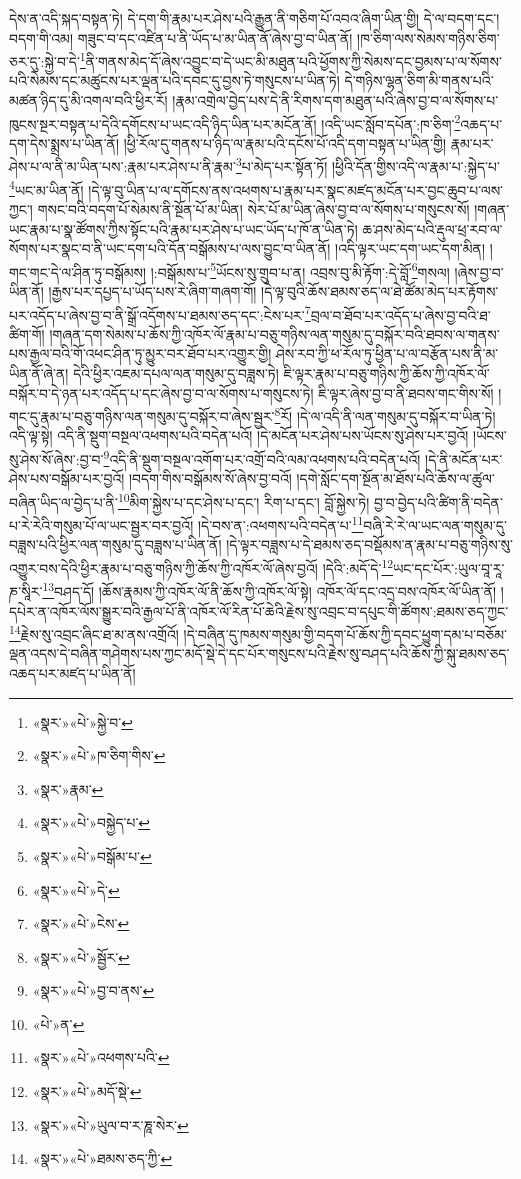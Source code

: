 དེས་ན་འདི་སྐད་བསྟན་ཏེ། དེ་དག་གི་རྣམ་པར་ཤེས་པའི་རྒྱུན་ནི་གཅིག་པོ་འབའ་ཞིག་ཡིན་གྱི། དེ་ལ་བདག་དང་། བདག་གི་འམ། གཟུང་བ་དང་འཛིན་པ་ནི་ཡོད་པ་མ་ཡིན་ནོ་ཞེས་བྱ་བ་ཡིན་ནོ། །ཁ་ཅིག་ལས་སེམས་གཉིས་ཅིག་ཅར་དུ་:སྐྱེ་བ་དེ་\footnote{«སྣར་»«པེ་»སྐྱེ་བ་}ནི་གནས་མེད་དོ་ཞེས་འབྱུང་བ་དེ་ཡང་མི་མཐུན་པའི་ཕྱོགས་ཀྱི་སེམས་དང་བྱམས་པ་ལ་སོགས་པའི་སེམས་དང་མཚུངས་པར་ལྡན་པའི་དབང་དུ་བྱས་ཏེ་གསུངས་པ་ཡིན་ཏེ། དེ་གཉིས་ལྷན་ཅིག་མི་གནས་པའི་མཚན་ཉིད་དུ་མི་འགལ་བའི་ཕྱིར་རོ། །རྣམ་འགྲེལ་བྱེད་པས་དེ་ནི་རིགས་དག་མཐུན་པའི་ཞེས་བྱ་བ་ལ་སོགས་པ་ཁུངས་སྔར་བསྟན་པ་དེའི་དགོངས་པ་ཡང་འདི་ཉིད་ཡིན་པར་མངོན་ནོ། །འདི་ཡང་སློབ་དཔོན་:ཁ་ཅིག་\footnote{«སྣར་»«པེ་»ཁ་ཅིག་གིས་}འཆད་པ་དག་དེས་སྨྲས་པ་ཡིན་ནོ། །ཕྱི་རོལ་དུ་གནས་པ་ཉིད་ལ་རྣམ་པའི་དངོས་པོ་འདི་དག་བསྟན་པ་ཡིན་གྱི། རྣམ་པར་ཤེས་པ་ལ་ནི་མ་ཡིན་པས་:རྣམ་པར་ཤེས་པ་ནི་རྣམ་\footnote{«སྣར་»རྣམ་}པ་མེད་པར་སྟོན་ཏོ། །ཕྱིའི་དོན་གྱིས་འདི་ལ་རྣམ་པ་:སྐྱེད་པ་\footnote{«སྣར་»«པེ་»བསྐྱེད་པ་}ཡང་མ་ཡིན་ནོ། །དེ་ལྟ་བུ་ཡིན་པ་ལ་དགོངས་ནས་འཕགས་པ་རྣམ་པར་སྣང་མཛད་མངོན་པར་བྱང་ཆུབ་པ་ལས་ཀྱང་། གསང་བའི་བདག་པོ་སེམས་ནི་སྔོན་པོ་མ་ཡིན། སེར་པོ་མ་ཡིན་ཞེས་བྱ་བ་ལ་སོགས་པ་གསུངས་སོ། །གཞན་ཡང་རྣམ་པ་སྣ་ཚོགས་ཀྱིས་སྟོང་པའི་རྣམ་པར་ཤེས་པ་ཡང་ཡོད་པ་ཁོ་ན་ཡིན་ཏེ། ཆ་ཤས་མེད་པའི་རྡུལ་ཕྲ་རབ་ལ་སོགས་པར་སྣང་བ་ནི་ཡང་དག་པའི་དོན་བསྒོམས་པ་ལས་བྱུང་བ་ཡིན་ནོ། །འདི་ལྟར་ཡང་དག་ཡང་དག་མིན། །གང་གང་དེ་ལ་ཤིན་ཏུ་བསྒོམས། །:བསྒོམས་པ་\footnote{«སྣར་»«པེ་»བསྒོམ་པ་}ཡོངས་སུ་གྲུབ་པ་ན། འབྲས་བུ་མི་རྟོག་:དེ་བློ་\footnote{«སྣར་»«པེ་»དེ་}གསལ། །ཞེས་བྱ་བ་ཡིན་ནོ། །རྒྱས་པར་དཔྱད་པ་ཡོད་པས་རེ་ཞིག་གཞག་གོ། །དེ་ལྟ་བུའི་ཆོས་ཐམས་ཅད་ལ་ཐེ་ཚོམ་མེད་པར་རྟོགས་པར་འདོད་པ་ཞེས་བྱ་བ་ནི་སྒྲོ་འདོགས་པ་ཐམས་ཅད་དང་:ངེས་པར་\footnote{«སྣར་»«པེ་»ངེས་}བྲལ་བ་ཐོབ་པར་འདོད་པ་ཞེས་བྱ་བའི་ཐ་ཚིག་གོ། །གཞན་དག་སེམས་པ་ཆོས་ཀྱི་འཁོར་ལོ་རྣམ་པ་བཅུ་གཉིས་ལན་གསུམ་དུ་བསྐོར་བའི་ཐབས་ལ་གནས་པས་རྒྱལ་བའི་གོ་འཕང་ཤིན་ཏུ་མྱུར་བར་ཐོབ་པར་འགྱུར་གྱི། ཤེས་རབ་ཀྱི་ཕ་རོལ་ཏུ་ཕྱིན་པ་ལ་བརྩོན་པས་ནི་མ་ཡིན་ནོ་ཞེ་ན། དེའི་ཕྱིར་འཇམ་དཔལ་ལན་གསུམ་དུ་བཟླས་ཏེ། ཇི་ལྟར་རྣམ་པ་བཅུ་གཉིས་ཀྱི་ཆོས་ཀྱི་འཁོར་ལོ་བསྐོར་བ་དེ་ཉན་པར་འདོད་པ་དང་ཞེས་བྱ་བ་ལ་སོགས་པ་གསུངས་ཏེ། ཇི་ལྟར་ཞེས་བྱ་བ་ནི་ཐབས་གང་གིས་སོ། །གང་དུ་རྣམ་པ་བཅུ་གཉིས་ལན་གསུམ་དུ་བསྐོར་བ་ཞེས་སྦྱར་\footnote{«སྣར་»«པེ་»སྦྱོར་}རོ། །དེ་ལ་འདི་ནི་ལན་གསུམ་དུ་བསྐོར་བ་ཡིན་ཏེ། འདི་ལྟ་སྟེ། འདི་ནི་སྡུག་བསྔལ་འཕགས་པའི་བདེན་པའོ། །དེ་མངོན་པར་ཤེས་པས་ཡོངས་སུ་ཤེས་པར་བྱའོ། །ཡོངས་སུ་ཤེས་སོ་ཞེས་:བྱ་བ་\footnote{«སྣར་»«པེ་»བྱ་བ་ནས་}འདི་ནི་སྡུག་བསྔལ་འགོག་པར་འགྲོ་བའི་ལམ་འཕགས་པའི་བདེན་པའོ། །དེ་ནི་མངོན་པར་ཤེས་པས་བསྒོམ་པར་བྱའོ། །བདག་གིས་བསྒོམས་སོ་ཞེས་བྱ་བའོ། །དགེ་སློང་དག་སྔོན་མ་ཐོས་པའི་ཆོས་ལ་ཚུལ་བཞིན་ཡིད་ལ་བྱེད་པ་ནི་\footnote{«པེ་»ན་}མིག་སྐྱེས་པ་དང་ཤེས་པ་དང་། རིག་པ་དང་། བློ་སྐྱེས་ཏེ། བྱ་བ་བྱེད་པའི་ཚིག་ནི་བདེན་པ་རེ་རེའི་གསུམ་པོ་ལ་ཡང་སྦྱར་བར་བྱའོ། །དེ་བས་ན་:འཕགས་པའི་བདེན་པ་\footnote{«སྣར་»«པེ་»འཕགས་པའི་}བཞི་རེ་རེ་ལ་ཡང་ལན་གསུམ་དུ་བཟླས་པའི་ཕྱིར་ལན་གསུམ་དུ་བཟླས་པ་ཡིན་ནོ། །དེ་ལྟར་བཟླས་པ་དེ་ཐམས་ཅད་བསྡོམས་ན་རྣམ་པ་བཅུ་གཉིས་སུ་འགྱུར་བས་དེའི་ཕྱིར་རྣམ་པ་བཅུ་གཉིས་ཀྱི་ཆོས་ཀྱི་འཁོར་ལོ་ཞེས་བྱའོ། །དེའི་:མདོ་དེ་\footnote{«སྣར་»«པེ་»མདོ་སྡེ་}ཡང་དང་པོར་:ཡུལ་བཱ་རཱ་ཎ་སཱིར་\footnote{«སྣར་»«པེ་»ཡུལ་བ་ར་ཎཱ་སེར་}བཤད་དོ། །ཆོས་རྣམས་ཀྱི་འཁོར་ལོ་ནི་ཆོས་ཀྱི་འཁོར་ལོ་སྟེ། འཁོར་ལོ་དང་འདྲ་བས་འཁོར་ལོ་ཡིན་ནོ། །དཔེར་ན་འཁོར་ལོས་སྒྱུར་བའི་རྒྱལ་པོ་ནི་འཁོར་ལོ་རིན་པོ་ཆེའི་རྗེས་སུ་འབྲང་བ་དཔུང་གི་ཚོགས་:ཐམས་ཅད་ཀྱང་\footnote{«སྣར་»«པེ་»ཐམས་ཅད་ཀྱི་}རྗེས་སུ་འབྲང་ཞིང་ཐ་མ་ནས་འགྲོའོ། །དེ་བཞིན་དུ་ཁམས་གསུམ་གྱི་བདག་པོ་ཆོས་ཀྱི་དབང་ཕྱུག་དམ་པ་བཅོམ་ལྡན་འདས་དེ་བཞིན་གཤེགས་པས་ཀྱང་མདོ་སྡེ་དེ་དང་པོར་གསུངས་པའི་རྗེས་སུ་བཤད་པའི་ཆོས་ཀྱི་སྐུ་ཐམས་ཅད་འཆད་པར་མཛད་པ་ཡིན་ནོ། 